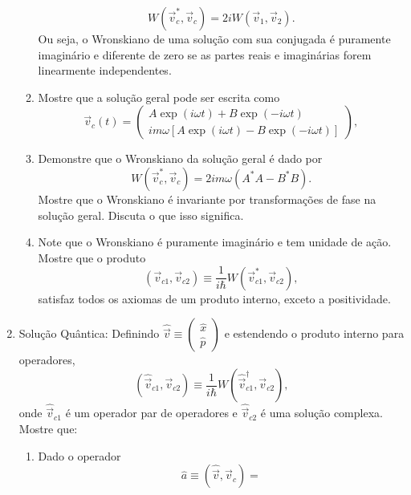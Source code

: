 \begin{enumerate}
\begin{enumerate}
\begin{equation*}
                  W(\vec{v}_c^*, \vec{v}_c) = 2iW(\vec{v}_1, \vec{v}_2).
                \end{equation*}
                Ou seja, o Wronskiano de uma solução com sua conjugada é puramente
                imaginário e diferente de zero se as partes reais e imaginárias forem
                linearmente independentes.
          \item Mostre que a solução geral pode ser escrita como
                \begin{equation*}
                  \vec{v}_c(t) = \begin{pmatrix} A \exp(i\omega t) + B \exp(-i\omega t) \\
                    im\omega \left[A \exp(i\omega t) - B \exp(-i\omega t)\right]\end{pmatrix},
                \end{equation*}
          \item Demonstre que o Wronskiano da solução geral é dado por
                \begin{equation*}
                  W(\vec{v}_c^*, \vec{v}_c) = 2im\omega\left(A^*A - B^*B\right).
                \end{equation*}
                Mostre que o Wronskiano é invariante por transformações de fase
                na solução geral. Discuta o que isso significa.
          \item Note que o Wronskiano é puramente imaginário e tem unidade de ação. Mostre que o produto
                $$\left(\vec{v}_{c1}, \vec{v}_{c2}\right) \equiv \frac{1}{i\hbar}W(\vec{v}_{c1}^*, \vec{v}_{c2}),$$
                satisfaz todos os axiomas de um produto interno, exceto a positividade.
        \end{enumerate}
  \item Solução Quântica: Definindo $\hat{\vec{v}} \equiv \begin{pmatrix} \hat{x} \\
            \hat{p}\end{pmatrix}$ e estendendo o produto interno para operadores,
        $$\left(\hat{\vec{v}}_{c1}, \vec{v}_{c2}\right) \equiv
          \frac{1}{i\hbar}W(\hat{\vec{v}}_{c1}^\dagger, \vec{v}_{c2}),$$ onde
        $\hat{\vec{v}}_{c1}$ é um operador par de operadores e $\hat{\vec{v}}_{c2}$ é
        uma solução complexa. Mostre que:
        \begin{enumerate}
          \item Dado o operador $$\hat{a} \equiv \left(\hat{\vec{v}}, \vec{v}_c\right) =
$$
\end{enumerate}
\end{enumerate}
